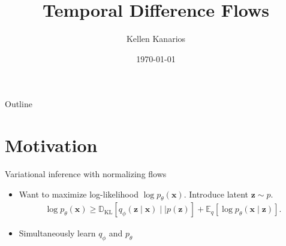 \documentclass{beamer}
\title{Temporal Difference Flows \cite{farebrotherTemporalDifferenceFlows2025}}
\author{Kellen Kanarios}
\date{\today}
\begin{document}
\begin{frame}
    \titlepage 
\end{frame}


\begin{frame}{Outline}
    \tableofcontents
\end{frame}

\section{Motivation}
\begin{frame}{Variational inference with normalizing flows \cite{rezendeVariationalInferenceNormalizing}} 
    \begin{itemize}
        \item Want to maximize log-likelihood \( \log p_{\theta}(\mathbf{x}) \). Introduce latent \( \mathbf{z} \sim p \). 
            \begin{align*}
                \log p_{\theta}(\mathbf{x}) \geq \mathbb{D}_{\mathrm{KL}}[q_{\phi}(\mathbf{z} \mid \mathbf{x}) \mid \mid p(\mathbf{z})] + \mathbb{E}_{q}[\log p_{\theta}(\mathbf{x} \mid \mathbf{z})] \tag*{(ELBO)}
            .\end{align*}
        \item Simultaneously learn \( q_{\phi} \) and \( p_{\theta} \)
    \end{itemize}
\end{frame}
\end{document}
